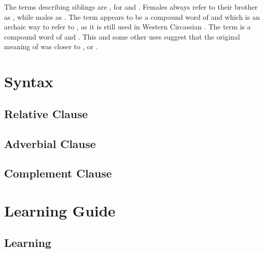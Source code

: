 \documentclass[a4paper, 10pt]{book}
\begin{document}
The terms describing siblings are ,  for  and . Females always refer to their brother as , while males as .
The term  appears to be a compound word of  and  which is an archaic way to refer to , as it is still used in Western Circassian . The term  is a compound word of   and  . This and some other uses suggest that the original meaning of  was closer to ,  or .

\part{Syntax}
\chapter{Relative Clause}
\chapter{Adverbial Clause}
\chapter{Complement Clause}
\part{Learning Guide}
\chapter{Learning}
\end{document}

